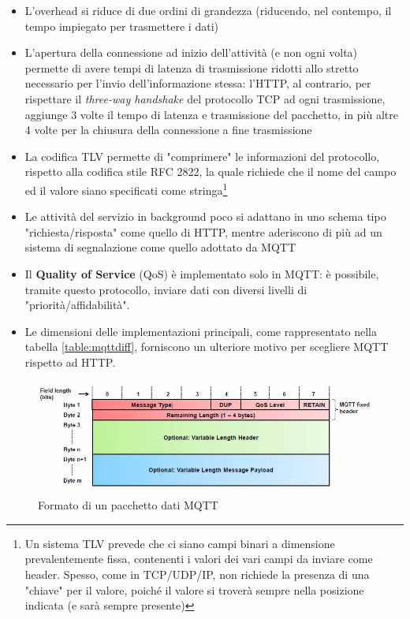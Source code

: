 \documentclass[a4paper,10pt]{memoir}
\begin{document}
\begin{itemize}
\item L'overhead si riduce di due ordini di grandezza (riducendo, nel contempo, il tempo impiegato per trasmettere i dati)
\item L'apertura della connessione ad inizio dell'attività (e non ogni volta) permette di avere tempi di latenza di trasmissione ridotti allo stretto necessario per l'invio dell'informazione stessa: l'HTTP, al contrario, per rispettare il \textit{three-way handshake} del protocollo TCP ad ogni trasmissione, aggiunge 3 volte il tempo di latenza e trasmissione del pacchetto, in più altre 4 volte per la chiusura della connessione a fine trasmissione
\item La codifica TLV permette di "comprimere" le informazioni del protocollo, rispetto alla codifica stile RFC 2822, la quale richiede che il nome del campo ed il valore siano specificati come stringa\footnote{Un sistema TLV prevede che ci siano campi binari a dimensione prevalentemente fissa, contenenti i valori dei vari campi da inviare come header. Spesso, come in TCP/UDP/IP, non richiede la presenza di una "chiave" per il valore, poiché il valore si troverà sempre nella posizione indicata (e sarà sempre presente)}
\item Le attività del servizio in background poco si adattano in uno schema tipo "richiesta/risposta" come quello di HTTP, mentre aderiscono di più ad un sistema di segnalazione come quello adottato da MQTT
\item Il \textbf{Quality of Service} (QoS) è implementato solo in MQTT: è possibile, tramite questo protocollo, inviare dati con diversi livelli di "priorità/affidabilità".
\item Le dimensioni delle implementazioni principali, come rappresentato nella tabella \ref{table:mqttdiff}, forniscono un ulteriore motivo per scegliere MQTT rispetto ad HTTP.
\end{itemize}

\begin{figure}[ht]
\centering
\caption{Formato di un pacchetto dati MQTT}
\label{fig:mqttpacket}
\includegraphics[width=\textwidth]{app/MQTT}
\end{figure}
\end{document}
